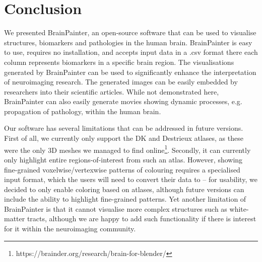 \documentclass{llncs}
\begin{document}
\section{Conclusion}

We presented BrainPainter, an open-source software that can be used to visualise structures, biomarkers and pathologies in the human brain. BrainPainter is easy to use, requires no installation, and accepts input data in a .csv format there each column represents biomarkers in a specific brain region. The visualisations generated by BrainPainter can be used to significantly enhance the interpretation of neuroimaging research. The generated images can be easily embedded by researchers into their scientific articles. While not demonstrated here, BrainPainter can also easily generate movies showing dynamic processes, e.g. propagation of pathology, within the human brain. 

Our software has several limitations that can be addressed in future versions. First of all, we currently only support the DK and Destrieux atlases, as these were the only 3D meshes we managed to find online\footnote{https://brainder.org/research/brain-for-blender/}. Secondly, it can currently only highlight entire regions-of-interest from such an atlas. However, showing fine-grained voxelwise/vertexwise patterns of colouring requires a specialised input format, which the users will need to convert their data to -- for usability, we decided to only enable coloring based on atlases, although future versions can include the ability to highlight fine-grained patterns. Yet another limitation of BrainPainter is that it cannot visualise more complex structures such as white-matter tracts, although we are happy to add such functionality if there is interest for it within the neuroimaging community.

\TODOaddfuturework

% 
% 

\end{document}
